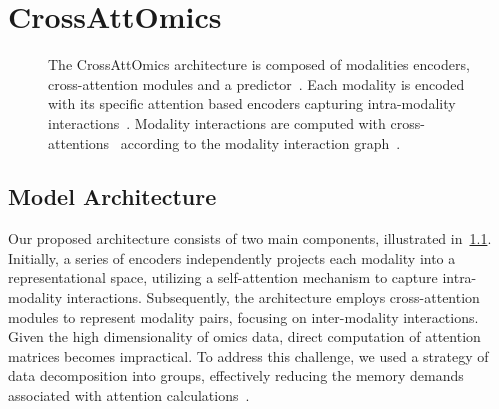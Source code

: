 \documentclass[../main.tex]{subfiles}
\begin{document}
\chapter{CrossAttOmics}\label{chap:crossattomics}
\minitocpage

\begin{figure}[htbp]
    \begin{subcaptiongroup}
        \ifSubfilesClassLoaded{%
        }{
        }
        \label{fig:crossattomics_A}
        \label{fig:crossattomics_B}
        \label{fig:crossattomics_C}
        \label{fig:crossattomics_D}
    \end{subcaptiongroup}

    \caption[The CrossAttOmics architecture]{The CrossAttOmics architecture is composed of modalities encoders, cross-attention modules and a predictor~. Each modality is encoded with its specific attention based encoders capturing intra-modality interactions~. Modality interactions are computed with cross-attentions~ according to the modality interaction graph~.}
    \label{fig:crossattomics_arch}
\end{figure}

\section{Model Architecture}
 Our proposed architecture consists of two main components, illustrated in~\cref{fig:crossattomics_arch}.
 Initially, a series of encoders independently projects each modality into a representational space, utilizing a self-attention mechanism to capture intra-modality interactions.
 Subsequently, the architecture employs cross-attention modules to represent modality pairs, focusing on inter-modality interactions.
 Given the high dimensionality of omics data, direct computation of attention matrices becomes impractical.
 To address this challenge, we used a strategy of data decomposition into groups, effectively reducing the memory demands associated with attention calculations~\cite{AttOmics}.
\end{document}
